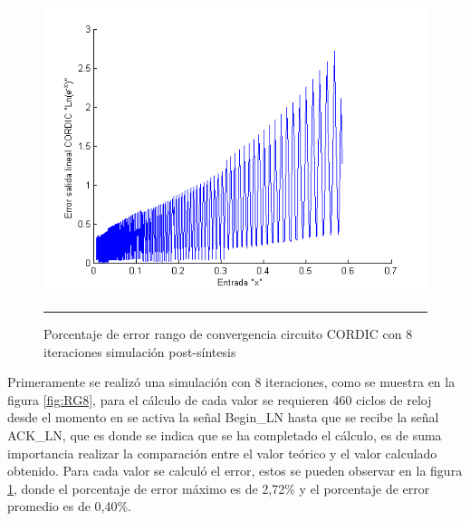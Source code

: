 \begin{figure}[H]
  \centering
    \includegraphics[scale=0.7]{./RANGO_8iter_ERROR.png}
    \rule{35em}{0.5pt}
  \caption[Porcentaje de error rango de convergencia circuito CORDIC con 8 iteraciones simulación post-síntesis]{Porcentaje de error rango de convergencia circuito CORDIC con 8 iteraciones simulación post-síntesis}
  \label{fig:RGE8}
\end{figure}


Primeramente se realizó una simulación con 8 iteraciones, como se muestra en la figura \ref{fig:RG8}, para el cálculo de cada valor se requieren 460 ciclos de reloj desde el momento en se activa la señal Begin\_LN hasta que se recibe la señal ACK\_LN, que es donde se indica que se ha completado el cálculo, es de suma importancia realizar la comparación entre el valor teórico y el valor calculado obtenido. Para cada valor se calculó el error, estos se pueden observar en la figura \ref{fig:RGE8}, donde el porcentaje de error máximo es de 2,72\% y el porcentaje de error promedio es de 0,40\%. 
 




